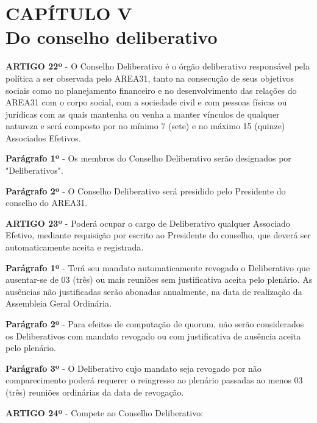 \chapter*{CAPÍTULO V \\ Do conselho deliberativo}


\textbf{ARTIGO 22º} - O Conselho Deliberativo é o órgão deliberativo 
responsável pela política a ser observada pelo AREA31, tanto na consecução 
de seus objetivos sociais como no planejamento financeiro e no desenvolvimento 
das relações do AREA31 com o corpo social, com a sociedade civil e com 
pessoas físicas ou jurídicas com as quais mantenha ou venha a manter 
vínculos de qualquer natureza e será composto por no mínimo 7 (sete) e 
no máximo 15 (quinze) Associados Efetivos.

\bigskip

\textbf{Parágrafo 1º} - Os membros do Conselho Deliberativo serão designados 
por "Deliberativos".

\bigskip

\textbf{Parágrafo 2º} - O Conselho Deliberativo será presidido pelo 
Presidente do conselho do AREA31.

\bigskip

\textbf{ARTIGO 23º} - Poderá ocupar o cargo de Deliberativo qualquer 
Associado Efetivo, mediante requisição por escrito ao Presidente do 
conselho, que deverá ser automaticamente aceita e registrada.

\bigskip

\textbf{Parágrafo 1º} - Terá seu mandato automaticamente revogado o 
Deliberativo que ausentar-se de 03 (três) ou mais reuniões sem justificativa 
aceita pelo plenário. As ausências não justificadas serão abonadas anualmente, 
na data de realização da Assembleia Geral Ordinária.

\bigskip

\textbf{Parágrafo 2º} - Para efeitos de computação de quorum, não serão 
considerados os Deliberativos com mandato revogado ou com justificativa de 
ausência aceita pelo plenário.

\bigskip

\textbf{Parágrafo 3º} - O Deliberativo cujo mandato seja revogado por não 
comparecimento poderá requerer o reingresso ao plenário passadas ao menos 
03 (três) reuniões ordinárias da data de revogação.

\bigskip

\textbf{ARTIGO 24º} - Compete ao Conselho Deliberativo:

